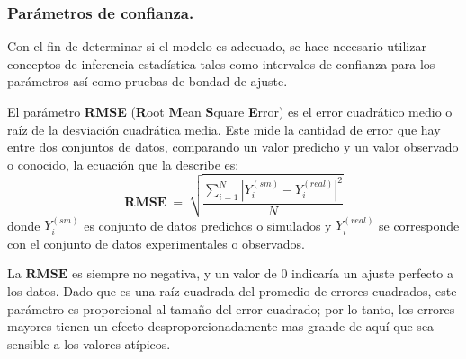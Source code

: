 \subsubsection{Parámetros de confianza.}
Con el fin de determinar si el modelo es adecuado, se hace necesario utilizar conceptos de inferencia estadística tales como intervalos de confianza para los parámetros así como pruebas de bondad de ajuste. 

El parámetro \textbf{RMSE} (\textbf{R}oot \textbf{M}ean \textbf{S}quare \textbf{E}rror) es el error cuadrático medio o raíz de la desviación cuadrática media. Este mide la cantidad de error que hay entre dos conjuntos de datos, comparando un valor predicho y un valor observado o conocido, la ecuación que la describe es:
\begin{equation}
\mathbf{RMSE} ~ = ~ \sqrt{\dfrac{\sum_{i=1}^N |Y_{i}^{(sm)} -Y_{i}^{(real)}|^2}{N}} 
\end{equation}
donde $Y_{i}^{(sm)}$  es conjunto de datos predichos o simulados y $Y_{i}^{(real)}$ se corresponde con el conjunto de datos experimentales o observados.

La $\mathbf{RMSE}$ es siempre no negativa, y un valor de $0$ indicaría un ajuste perfecto a los datos. Dado que es una raíz cuadrada del promedio de errores cuadrados, este parámetro es proporcional al tamaño del error cuadrado; por lo tanto, los errores mayores tienen un efecto desproporcionadamente mas grande de aquí que sea sensible a los valores atípicos.

